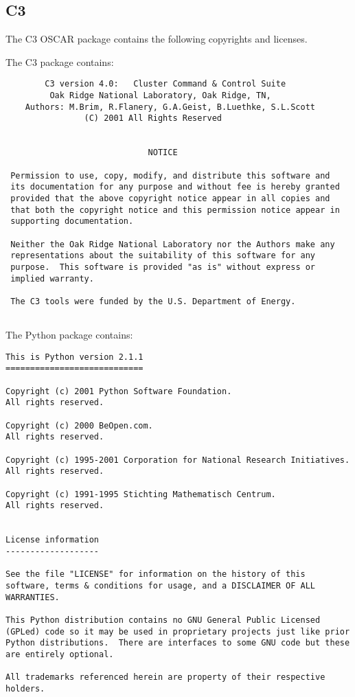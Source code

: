 %
%
%

\subsection{C3}
The C3 OSCAR package contains the following copyrights and licenses.

The C3 package contains:

\begin{verbatim}
        C3 version 4.0:   Cluster Command & Control Suite
         Oak Ridge National Laboratory, Oak Ridge, TN,
    Authors: M.Brim, R.Flanery, G.A.Geist, B.Luethke, S.L.Scott
                (C) 2001 All Rights Reserved


                             NOTICE

 Permission to use, copy, modify, and distribute this software and
 its documentation for any purpose and without fee is hereby granted
 provided that the above copyright notice appear in all copies and
 that both the copyright notice and this permission notice appear in
 supporting documentation.

 Neither the Oak Ridge National Laboratory nor the Authors make any
 representations about the suitability of this software for any
 purpose.  This software is provided "as is" without express or
 implied warranty.

 The C3 tools were funded by the U.S. Department of Energy.


\end{verbatim}

The Python package contains:

\begin{verbatim}
This is Python version 2.1.1
============================

Copyright (c) 2001 Python Software Foundation.
All rights reserved.

Copyright (c) 2000 BeOpen.com.
All rights reserved.

Copyright (c) 1995-2001 Corporation for National Research Initiatives.
All rights reserved.

Copyright (c) 1991-1995 Stichting Mathematisch Centrum.
All rights reserved.


License information
-------------------

See the file "LICENSE" for information on the history of this
software, terms & conditions for usage, and a DISCLAIMER OF ALL
WARRANTIES.

This Python distribution contains no GNU General Public Licensed
(GPLed) code so it may be used in proprietary projects just like prior
Python distributions.  There are interfaces to some GNU code but these
are entirely optional.

All trademarks referenced herein are property of their respective
holders.
\end{verbatim}

